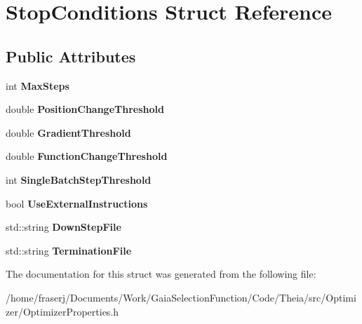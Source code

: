 \hypertarget{structStopConditions}{}\section{Stop\+Conditions Struct Reference}
\label{structStopConditions}
\subsection*{Public Attributes}
\begin{DoxyCompactItemize}
\item 
\mbox{\label{structStopConditions_af2622385130b911bed2c486ae8c460ff}} 
int {\bfseries Max\+Steps}
\item 
\mbox{\label{structStopConditions_a43d87fc57a46592e5ebe7eb74ed0cf9f}} 
double {\bfseries Position\+Change\+Threshold}
\item 
\mbox{\label{structStopConditions_a8b6e6f9c935df6006ded3a0879dd33de}} 
double {\bfseries Gradient\+Threshold}
\item 
\mbox{\label{structStopConditions_adc5c6c3a77f1d2162419ba06dbfa6b03}} 
double {\bfseries Function\+Change\+Threshold}
\item 
\mbox{\label{structStopConditions_af78938739bfb3fc5971b9cbb4e61331d}} 
int {\bfseries Single\+Batch\+Step\+Threshold}
\item 
\mbox{\label{structStopConditions_a4b1bfd27c0581edec18fe55ae1cdced3}} 
bool {\bfseries Use\+External\+Instructions}
\item 
\mbox{\label{structStopConditions_ac32b60d59dd9c352b5dccc54d817eb6a}} 
std\+::string {\bfseries Down\+Step\+File}
\item 
\mbox{\label{structStopConditions_ae590bf77b1deeee760750df2a11fa6d8}} 
std\+::string {\bfseries Termination\+File}
\end{DoxyCompactItemize}


The documentation for this struct was generated from the following file\+:\begin{DoxyCompactItemize}
\item 
/home/fraserj/\+Documents/\+Work/\+Gaia\+Selection\+Function/\+Code/\+Theia/src/\+Optimizer/Optimizer\+Properties.\+h\end{DoxyCompactItemize}
